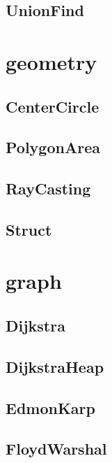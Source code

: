 \subsection{ UnionFind}
\raggedbottom
\hrulefill

\section{geometry}
\subsection{ CenterCircle}
\raggedbottom
\hrulefill
\subsection{ PolygonArea}
\raggedbottom
\hrulefill
\subsection{ RayCasting}
\raggedbottom
\hrulefill
\subsection{ Struct}
\raggedbottom
\hrulefill

\section{graph}
\subsection{ Dijkstra}
\raggedbottom
\hrulefill
\subsection{ DijkstraHeap}
\raggedbottom
\hrulefill
\subsection{ EdmonKarp}
\raggedbottom
\hrulefill
\subsection{ FloydWarshal}
\raggedbottom
\hrulefill
